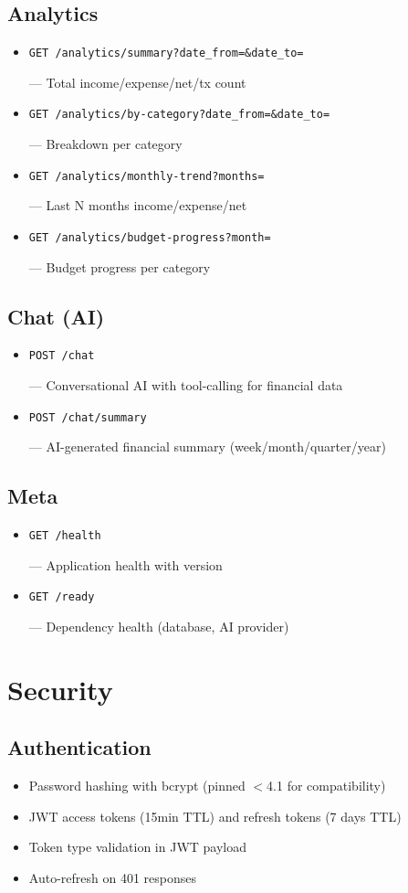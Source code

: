 \documentclass[11pt,a4paper]{article}
\newcommand{\code}[1]{\colorbox{codebg}{\strut\texttt{\small #1}}}
\begin{document}
\subsection{Analytics}
\begin{itemize}[leftmargin=*,itemsep=1pt]
  \item \code{GET /analytics/summary?date\_from=\&date\_to=} --- Total income/expense/net/tx count
  \item \code{GET /analytics/by-category?date\_from=\&date\_to=} --- Breakdown per category
  \item \code{GET /analytics/monthly-trend?months=} --- Last N months income/expense/net
  \item \code{GET /analytics/budget-progress?month=} --- Budget progress per category
\end{itemize}

\subsection{Chat (AI)}
\begin{itemize}[leftmargin=*,itemsep=1pt]
  \item \code{POST /chat} --- Conversational AI with tool-calling for financial data
  \item \code{POST /chat/summary} --- AI-generated financial summary (week/month/quarter/year)
\end{itemize}

\subsection{Meta}
\begin{itemize}[leftmargin=*,itemsep=1pt]
  \item \code{GET /health} --- Application health with version
  \item \code{GET /ready} --- Dependency health (database, AI provider)
\end{itemize}

\section{Security}

\subsection{Authentication}
\begin{itemize}[leftmargin=*,itemsep=1pt]
  \item Password hashing with bcrypt (pinned $<$4.1 for compatibility)
  \item JWT access tokens (15min TTL) and refresh tokens (7 days TTL)
  \item Token type validation in JWT payload
  \item Auto-refresh on 401 responses
\end{itemize}
\end{document}
